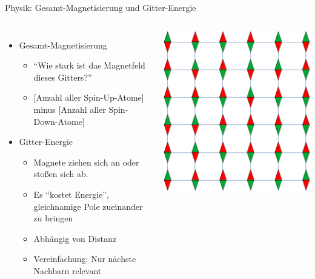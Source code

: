 \begin{frame}{Physik: Gesamt-Magnetisierung und Gitter-Energie}
%
\begin{columns}[T]
\begin{itemize}
\item Gesamt-Magnetisierung
	\begin{itemize}
	\item \enquote{Wie stark ist das Magnetfeld dieses Gitters?}
	\item {}[Anzahl aller Spin-Up-Atome] minus [Anzahl aller Spin-Down-Atome]
	 \end{itemize} 
\item Gitter-Energie
	\begin{itemize}
	\item Magnete ziehen sich an oder stoßen sich ab.
	\item Es \enquote{kostet Energie}, gleichnamige Pole zueinander zu bringen
	\item Abhängig von Distanz
	\item Vereinfachung: Nur nächste Nachbarn relevant
	\end{itemize}
\end{itemize}
%
\includegraphics[width=.7\linewidth]{./gfx/spinLattice}
\end{columns}
%
\end{frame}


